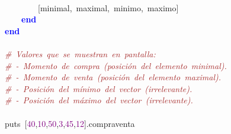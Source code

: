 \mbox{} \\
\mbox{}\ \ \ \ \ \ \ \ \textcolor{BrickRed}{[}minimal\textcolor{BrickRed}{,}\ maximal\textcolor{BrickRed}{,}\ minimo\textcolor{BrickRed}{,}\ maximo\textcolor{BrickRed}{]}\  \\
\mbox{}\ \ \ \ \textbf{\textcolor{Blue}{end}}\  \\
\mbox{}\textbf{\textcolor{Blue}{end}}\  \\
\mbox{} \\
\mbox{}\textit{\textcolor{Brown}{\#\ Valores\ que\ se\ muestran\ en\ pantalla:\ }} \\
\mbox{}\textit{\textcolor{Brown}{\#\ -\ Momento\ de\ compra\ (posición\ del\ elemento\ minimal).\ }} \\
\mbox{}\textit{\textcolor{Brown}{\#\ -\ Momento\ de\ venta\ (posición\ del\ elemento\ maximal).\ }} \\
\mbox{}\textit{\textcolor{Brown}{\#\ -\ Posición\ del\ mínimo\ del\ vector\ (irrelevante).\ }} \\
\mbox{}\textit{\textcolor{Brown}{\#\ -\ Posición\ del\ máximo\ del\ vector\ (irrelevante).\ }} \\
\mbox{} \\
\mbox{}puts\ \textcolor{BrickRed}{[}\textcolor{Purple}{40}\textcolor{BrickRed}{,}\textcolor{Purple}{10}\textcolor{BrickRed}{,}\textcolor{Purple}{50}\textcolor{BrickRed}{,}\textcolor{Purple}{3}\textcolor{BrickRed}{,}\textcolor{Purple}{45}\textcolor{BrickRed}{,}\textcolor{Purple}{12}\textcolor{BrickRed}{].}compraventa \\
\mbox{} \\
\mbox{} \\
\mbox{} \\
\mbox{} \\
\mbox{} \\
\mbox{} \\
\mbox{} \\
\mbox{}
